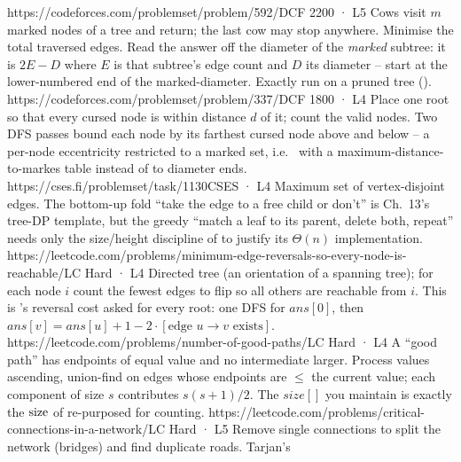 \begin{mixedset}
    {https://codeforces.com/problemset/problem/592/D}{CF 2200 · L5}
    {Cows visit $m$ marked nodes of a tree and return; the last cow may stop anywhere. Minimise the
    total traversed edges. Read the answer off the diameter of the \emph{marked} subtree: it is
    $2E - D$ where $E$ is that subtree's edge count and $D$ its diameter -- start at the lower-numbered
    end of the marked-diameter. Exactly  run on a pruned tree ().}
    {https://codeforces.com/problemset/problem/337/D}{CF 1800 · L4}
    {Place one root so that every cursed node is within distance $d$ of it; count the valid nodes. Two
    DFS passes bound each node by its farthest cursed node above and below -- a per-node eccentricity
    restricted to a marked set, i.e.\  with a maximum-distance-to-markes table
    instead of to diameter ends.}
    {https://cses.fi/problemset/task/1130}{CSES · L4}
    {Maximum set of vertex-disjoint edges. The bottom-up fold ``take the edge to a free child or don't''
    is Ch.~13's tree-DP template, but the greedy ``match a leaf to its parent, delete both, repeat''
    needs only the size/height discipline of  to justify its $\Theta(n)$ implementation.}
    {https://leetcode.com/problems/minimum-edge-reversals-so-every-node-is-reachable/}{LC Hard · L4}
    {Directed tree (an orientation of a spanning tree); for each node $i$ count the fewest edges to flip
    so all others are reachable from $i$. This is 's reversal cost asked for every
    root: one DFS for $\mathit{ans}[0]$, then $ans[v]=ans[u]+1-2\cdot[\text{edge } u\!\to\!v \text{ exists}]$.}
    {https://leetcode.com/problems/number-of-good-paths/}{LC Hard · L4}
    {A ``good path'' has endpoints of equal value and no intermediate larger. Process values ascending,
    union-find on edges whose endpoints are $\le$ the current value; each component of size $s$
    contributes $s(s+1)/2$. The $\mathit{size}[]$ you maintain is exactly the $\operatorname{size}$ of 
    re-purposed for counting.}
    {https://leetcode.com/problems/critical-connections-in-a-network/}{LC Hard · L5}
    {Remove single connections to split the network (bridges) and find duplicate roads. Tarjan's
}
\end{mixedset}
